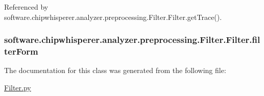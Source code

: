 Referenced by software.\+chipwhisperer.\+analyzer.\+preprocessing.\+Filter.\+Filter.\+get\+Trace().

\hypertarget{classsoftware_1_1chipwhisperer_1_1analyzer_1_1preprocessing_1_1Filter_1_1Filter_a753b5278c41e90755bb358f6f857fd83}{}
\subsubsection[{filter\+Form}]{\setlength{\rightskip}{0pt plus 5cm}software.\+chipwhisperer.\+analyzer.\+preprocessing.\+Filter.\+Filter.\+filter\+Form}\label{classsoftware_1_1chipwhisperer_1_1analyzer_1_1preprocessing_1_1Filter_1_1Filter_a753b5278c41e90755bb358f6f857fd83}


The documentation for this class was generated from the following file\+:\begin{DoxyCompactItemize}
\item 
\hyperlink{Filter_8py}{Filter.\+py}\end{DoxyCompactItemize}
